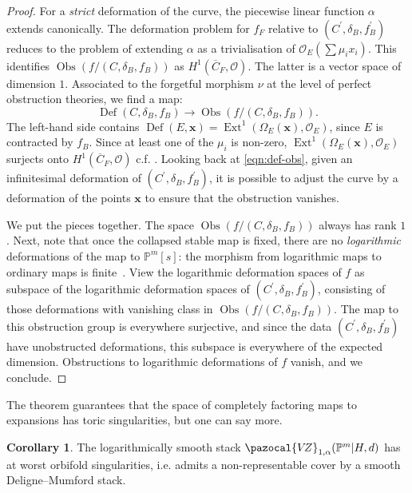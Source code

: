 \documentclass[11pt]{amsart}
\newcommand{\VZ}{\pazocal{V\!Z}}
\newcommand{\OO}{\mathcal{O}}
\renewcommand{\to}{\rightarrow}
\theoremstyle{definition}
\newtheorem{cor}[thm]{Corollary}
\theoremstyle{definition}
\begin{document}
\begin{proof}
For a \textit{strict} deformation of the curve, the piecewise linear function $\alpha$ extends canonically. The deformation problem for $f_F$ relative to $(C^\prime,\delta_B,f_B^\prime)$ reduces to the problem of extending $\alpha$ as a trivialisation of $\OO_E(\sum\mu_i x_i)$. This identifies $\operatorname{Obs}(f/(C,\delta_B,f_B))$ as $H^1(\overline C_F,\OO)$. The latter is a vector space of dimension $1$. Associated to the forgetful morphism $\nu$ at the level of perfect obstruction theories, we find a map:
\begin{equation}\label{eqn:def-obs}\operatorname{Def}(C,\delta_B,f_B)\to \operatorname{Obs}(f/(C,\delta_B,f_B)).\end{equation}
The left-hand side contains  $\operatorname{Def}(E,\mathbf{x})=\operatorname{Ext}^1(\Omega_E(\mathbf x),\OO_E)$, since $E$ is contracted by $f_B$. Since at least one of the $\mu_i$ is non-zero, $\operatorname{Ext}^1(\Omega_E(\mathbf x),\OO_E)$ surjects onto $H^1(\overline C_F,\OO)$ c.f. \cite[Corollary 3.5.3]{RSPW2}. Looking back at \eqref{eqn:def-obs}, given an infinitesimal deformation of $(C^\prime,\delta_B,f_B^\prime)$, it is possible to adjust the curve by a deformation of the points $\mathbf x$ to ensure that the obstruction vanishes.

We put the pieces together. The space $ \operatorname{Obs}(f/(C,\delta_B,f_B))$ always has rank $1$. Next, note that once the collapsed stable map is fixed, there are no \textit{logarithmic} deformations of the map to $\mathbb P^m[s]$: the morphism from logarithmic maps to ordinary maps is finite~\cite[\S~3.7]{ChenLog}. View the logarithmic deformation spaces of $f$ as subspace of the logarithmic deformation spaces of $(C^\prime,\delta_B,f_B^\prime)$, consisting of those deformations with vanishing class in $\operatorname{Obs}(f/(C,\delta_B,f_B))$. The map to this obstruction group is everywhere surjective, and since the data $(C^\prime,\delta_B,f_B^\prime)$ have unobstructed deformations, this subspace is everywhere of the expected dimension. Obstructions to logarithmic deformations of $f$ vanish, and we conclude.
\end{proof}

The theorem guarantees that the space of completely factoring maps to expansions has toric singularities, but one can say more.

\begin{cor}
The logarithmically smooth stack $\VZ_{1,\alpha}(\mathbb P^m|H,d)$ has at worst orbifold singularities, i.e. admits a non-representable cover by a smooth Deligne--Mumford stack.
\end{cor}
\end{document}
